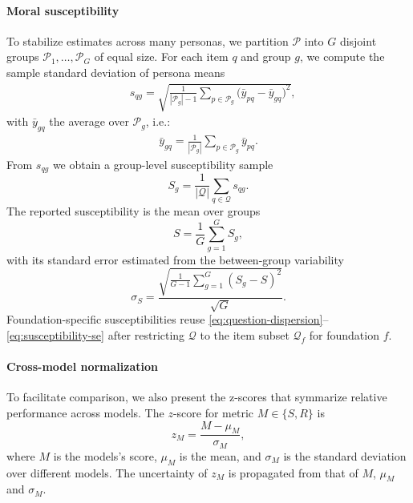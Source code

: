 \documentclass{article}
\begin{document}
\paragraph{Moral susceptibility} To stabilize estimates across many personas, we partition \(\mathcal{P}\) into \(G\) disjoint groups \(\mathcal{P}_1,\ldots,\mathcal{P}_G\) of equal size. For each item \(q\) and group \(g\), we compute the sample standard deviation of persona means
\begin{align}
  & s_{qg} = \sqrt{\frac{1}{|\mathcal{P}_g|-1} \sum_{p \in \mathcal{P}_g} \Big(\bar{y}_{pq} - \bar{y}_{gq}\Big)^2},
  \label{eq:question-dispersion}
\end{align}
with $\bar{y}_{gq}$ the average over $\mathcal{P}_g$, i.e.: 
\begin{align}
  \bar{y}_{gq} = \frac{1}{|\mathcal{P}_g|} \sum_{p \in \mathcal{P}_g} \bar{y}_{pq}.
\end{align}
From $s_{qg}$ we obtain a group-level susceptibility sample
\begin{equation}
  S_g = \frac{1}{|\mathcal{Q}|} \sum_{q \in \mathcal{Q}} s_{qg}.\label{eq:group-susceptibility}
\end{equation}
The reported susceptibility is the mean over groups
\begin{equation}
  S = \frac{1}{G} \sum_{g=1}^{G} S_g,\label{eq:overall-susceptibility}
\end{equation}
with its standard error estimated from the between-group variability
\begin{equation}
  \sigma_S = \frac{\sqrt{\frac{1}{G-1} \sum_{g=1}^{G} (S_g - S)^2}}{\sqrt{G}}.\label{eq:susceptibility-se}
\end{equation}
Foundation-specific susceptibilities reuse \eqref{eq:question-dispersion}--\eqref{eq:susceptibility-se} after restricting \(\mathcal{Q}\) to the item subset \(\mathcal{Q}_f\) for foundation \(f\).

\paragraph{Cross-model normalization} To facilitate comparison, we also present the z-scores that symmarize relative performance across models. The $z$-score for metric $M\in \{S,R\}$ is
\begin{equation}
  z_{M} = \frac{M - \mu_M}{\sigma_M},
  \label{eq:zscore}
\end{equation}
where $M$ is the models's score, $\mu_M$ is the mean, and $\sigma_M$ is the standard deviation over different models. The uncertainty of $z_M$ is propagated from that of $M$, $\mu_M$ and $\sigma_M$.
\end{document}
